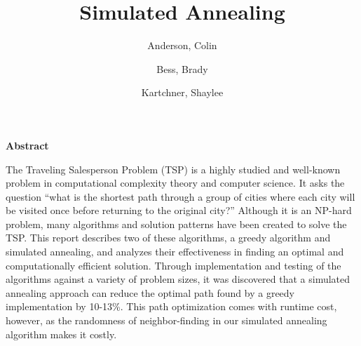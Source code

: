 \documentclass{article}
\title{Simulated Annealing}
\author{
    Anderson, Colin
    \and
    Bess, Brady
    \and
    Kartchner, Shaylee}
\date{}
\begin{document}
\maketitle

\noindent\makebox[\linewidth]{\rule{\textwidth}{0.4pt}}

\begin{center}
    \textbf{Abstract}
\end{center}

The Traveling Salesperson Problem (TSP) is a highly studied and well-known problem in computational complexity theory and computer science.  It asks the question “what is the shortest path through a group of cities where each city will be visited once before returning to the original city?” Although it is an NP-hard problem, many algorithms and solution patterns have been created to solve the TSP.  This report describes two of these algorithms, a greedy algorithm and simulated annealing, and analyzes their effectiveness in finding an optimal and computationally efficient solution.  Through implementation and testing of the algorithms against a variety of problem sizes, it was discovered that a simulated annealing approach can reduce the optimal path found by a greedy implementation by 10-13\%.  This path optimization comes with runtime cost, however, as the randomness of neighbor-finding in our simulated annealing algorithm makes it costly.  

\noindent\makebox[\linewidth]{\rule{\textwidth}{0.4pt}}
\end{document}
